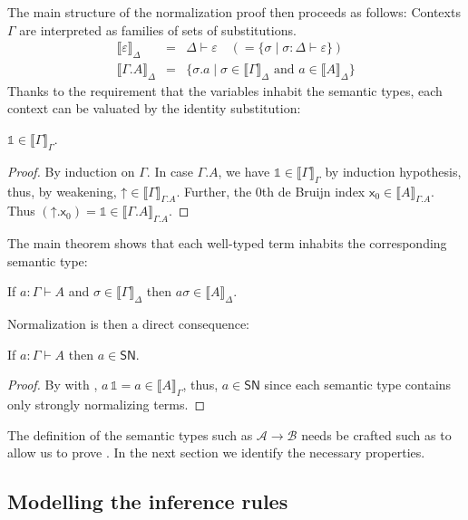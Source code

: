 \documentclass[a4paper,USenglish,cleveref, autoref, thm-restate]{lipics-v2021}
\newcommand{\den}[2][]{\llbracket#2\rrbracket^{#1}}
\newcommand{\sid}{\mathds{1}}
\newcommand{\Den}[2]{\den{#1}_{#2}}
\newcommand{\Ge}{\ensuremath{\varepsilon}}
\newcommand{\Gs}{\ensuremath{\sigma}}
\newcommand{\x}{\mathsf{x}}
\newcommand{\A}{\mathcal{A}}
\newcommand{\B}{\mathcal{B}}
\newcommand{\SN}{\mathsf{SN}}
\newcommand{\up}{\mathord{\uparrow}}
\begin{document}
The main structure of the normalization proof then proceeds as follows:
Contexts $\Gamma$ are interpreted as families of sets of
substitutions.
\[
  \begin{array}{lll}
\Den \Ge \Delta & = & \Delta \vdash \Ge
\quad ( {} = \{ \sigma \mid \sigma : \Delta \vdash \Ge \})\\
\Den{\Gamma.A} \Delta & = & \{ \Gs.a \mid \Gs \in \Den \Gamma \Delta
                            \mbox{ and } a \in \Den A \Delta \}
  \end{array}
\]
Thanks to the requirement that the variables inhabit the semantic
types, each context can be valuated by the identity substitution:
\begin{lemma}
  \label{lem:id}
  $\sid \in \Den \Gamma \Gamma$.
\end{lemma}
\begin{proof}
  By induction on $\Gamma$.  In case $\Gamma.A$, we have
  $\sid \in \Den \Gamma \Gamma$ by induction hypothesis, thus, by
  weakening, ${\up} \in \Den\Gamma{\Gamma.A}$.  Further, the 0th de
  Bruijn index $\x_0 \in \Den A {\Gamma.A}$.
  Thus $(\up.\x_0) = \sid \in \Den{\Gamma.A}{\Gamma.A}$.
\end{proof}

The main theorem shows that each well-typed term inhabits the corresponding semantic type:
\begin{theorem}
  \label{thm:fund}
  If $a : \Gamma \vdash A$ and $\Gs \in \Den \Gamma \Delta$ then $a
  \sigma \in \Den A \Delta$.
\end{theorem}
Normalization is then a direct consequence:
\begin{corollary}
  If $a : \Gamma \vdash A$ then $a \in \SN$.
\end{corollary}
\begin{proof}
  By  with , $a\, \sid = a \in \Den A
  \Gamma$, thus, $a \in \SN$ since each semantic type contains only
  strongly normalizing terms.
\end{proof}

The definition of the semantic types such as $\A \to \B$ needs be
crafted such as to allow us to prove .
In the next section we identify the necessary properties.

\subsection{Modelling the inference rules}
\end{document}
